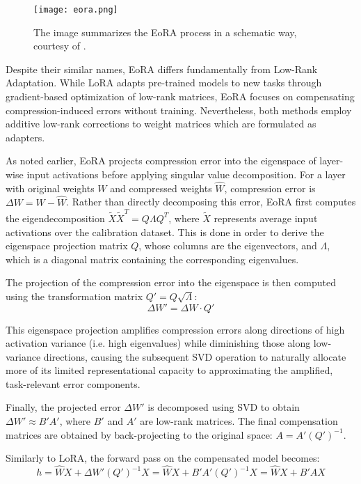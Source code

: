\begin{figure}[htbp]
    \centering
    \texttt{[image: eora.png]}
    \caption[EoRA Overview]{The image summarizes the EoRA process in a schematic way, courtesy of \cite{eora}.}
    \label{fig:eora}
\end{figure}


Despite their similar names, EoRA differs fundamentally from Low-Rank Adaptation. While LoRA adapts pre-trained models to new tasks through gradient-based optimization of low-rank matrices, EoRA focuses on compensating compression-induced errors without training. Nevertheless, both methods employ additive low-rank corrections to weight matrices which are formulated as adapters.

As noted earlier, EoRA projects compression error into the eigenspace of layer-wise input activations before applying singular value decomposition. For a layer with original weights $W$ and compressed weights $\hat{W}$, compression error is $\Delta W = W - \hat{W}$. Rather than directly decomposing this error, EoRA first computes the eigendecomposition $\tilde{X}\tilde{X}^T = Q\Lambda Q^T$, where $\tilde{X}$ represents average input activations over the calibration dataset. This is done in order to derive the eigenspace projection matrix $Q$, whose columns are the eigenvectors, and $\Lambda$, which is a diagonal matrix containing the corresponding eigenvalues.

The projection of the compression error into the eigenspace is then computed using the transformation matrix $Q' = Q\sqrt{\Lambda}$:
\begin{equation}
\Delta W' = \Delta W \cdot Q'
\end{equation}

This eigenspace projection amplifies compression errors along directions of high activation variance (i.e. high eigenvalues) while diminishing those along low-variance directions, causing the subsequent SVD operation to naturally allocate more of its limited representational capacity to approximating the amplified, task-relevant error components.

Finally, the projected error $\Delta W'$ is decomposed using SVD to obtain $\Delta W' \approx B'A'$, where $B'$ and $A'$ are low-rank matrices. The final compensation matrices are obtained by back-projecting to the original space: $A = A'(Q')^{-1}$.

Similarly to LoRA, the forward pass on the compensated model becomes:
\begin{equation}
h = \hat{W}X + \Delta W'(Q')^{-1}X = \hat{W}X + B'A'(Q')^{-1}X = \hat{W}X + B'AX
\end{equation}

